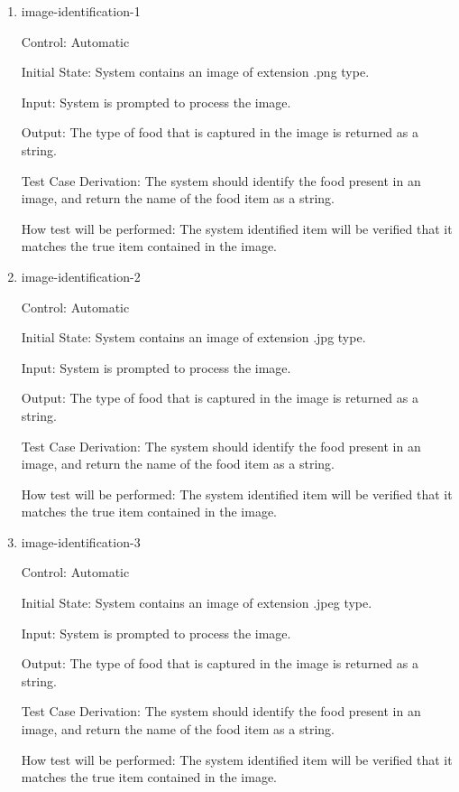 \documentclass[12pt, titlepage]{article}
\begin{document}
	\begin{enumerate}
		
		\item{image-identification-1\\}
		
		Control: Automatic
		
		Initial State: System contains an image of extension .png type.
		
		Input: System is prompted to process the image.
		
		Output: The type of food that is captured in the image is returned as a string.
		
		Test Case Derivation: The system should identify the food present in an image, and return the name of the food item as a string.
		
		How test will be performed: The system identified item will be verified that it matches the true item contained in the image.
		
		\item{image-identification-2\\}
		
		Control: Automatic
		
		Initial State: System contains an image of extension .jpg type.
		
		Input: System is prompted to process the image.
		
		Output: The type of food that is captured in the image is returned as a string.
		
		Test Case Derivation: The system should identify the food present in an image, and return the name of the food item as a string.
		
		How test will be performed: The system identified item will be verified that it matches the true item contained in the image.
		
		\item{image-identification-3\\}
		
		Control: Automatic
		
		Initial State: System contains an image of extension .jpeg type.
		
		Input: System is prompted to process the image.
		
		Output: The type of food that is captured in the image is returned as a string.
		
		Test Case Derivation: The system should identify the food present in an image, and return the name of the food item as a string.
		
		How test will be performed: The system identified item will be verified that it matches the true item contained in the image.
		
	\end{enumerate}
	
\end{document}
